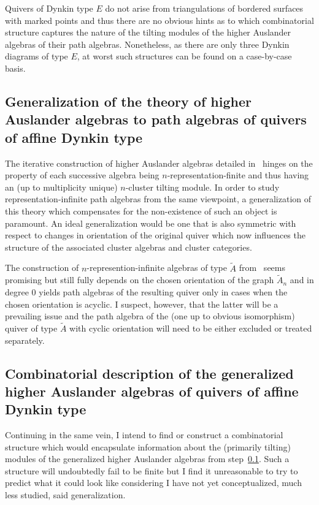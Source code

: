 \documentclass[a4paper,oneside,svgnames]{amsart}
\theoremstyle{plain}
\theoremstyle{definition}
\begin{document}
 Quivers of Dynkin type $E$ do not arise from triangulations of bordered
 surfaces with marked points and thus there are no obvious hints as to which
 combinatorial structure captures the nature of the tilting modules of the
 higher Auslander algebras of their path algebras. Nonetheless, as there are
 only three Dynkin diagrams of type $E$, at worst such structures can be found
 on a case-by-case basis.

 \subsection{Generalization of the theory of higher Auslander algebras to path
 algebras of quivers of affine Dynkin type}
 \label{step-2}

 The iterative construction of higher Auslander algebras detailed in~\cite{iya}
 hinges on the property of each successive algebra being
 $n$-representation-finite and thus having an (up to multiplicity unique)
 $n$-cluster tilting module. In order to study representation-infinite path
 algebras from the same viewpoint, a generalization of this theory which
 compensates for the non-existence of such an object is paramount. An ideal
 generalization would be one that is also symmetric with respect to changes in
 orientation of the original quiver which now influences the structure of the
 associated cluster algebras and cluster categories.

 The construction of $n$-represention-infinite algebras of type $\tilde{A}$
 from~\cite[Section~5]{hio} seems promising but still fully depends on the
 chosen orientation of the graph $\tilde{A}_n$ and in degree 0 yields path
 algebras of the resulting quiver only in cases when the chosen orientation is
 acyclic. I suspect, however, that the latter will be a prevailing issue and the
 path algebra of the (one up to obvious isomorphism) quiver of type $\tilde{A}$
 with cyclic orientation will need to be either excluded or treated separately.

 \subsection{Combinatorial description of the generalized higher Auslander
 algebras of quivers of affine Dynkin type}
 \label{step-3}

 Continuing in the same vein, I intend to find or construct a combinatorial
 structure which would encapsulate information about the (primarily tilting)
 modules of the generalized higher Auslander algebras from step~\ref{step-2}.
 Such a structure will undoubtedly fail to be finite but I find it unreasonable
 to try to predict what it could look like considering I have not yet
 conceptualized, much less studied, said generalization.
\end{document}
